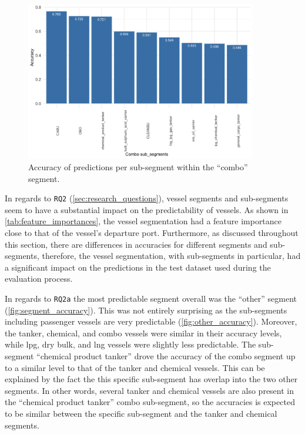 \begin{figure}[htbp]
    \centering
    \includegraphics[width=0.9\textwidth]{figures/results/seg_combo_acc}
    \caption{Accuracy of predictions per sub-segment within the ``combo'' segment.}
    \label{fig:combo_accuracy}
\end{figure}

In regards to \texttt{RQ2} (\cref{sec:research_questions}), vessel segments and sub-segments seem to have a substantial impact on the predictability of vessels. As shown in \cref{tab:feature_importances}, the vessel segmentation had a feature importance close to that of the vessel's departure port. Furthermore, as discussed throughout this section, there are differences in accuracies for different segments and sub-segments, therefore, the vessel segmentation, with sub-segments in particular, had a significant impact on the predictions in the test dataset used during the evaluation process.

In regards to \texttt{RQ2a} the most predictable segment overall was the ``other'' segment (\cref{fig:segment_accuracy}). This was not entirely surprising as the sub-segments including passenger vessels are very predictable (\cref{fig:other_accuracy}). Moreover, the tanker, chemical, and combo vessels were similar in their accuracy levels, while \acrshort{lpg}, dry bulk, and \acrshort{lng} vessels were slightly less predictable. The sub-segment ``chemical product tanker'' drove the accuracy of the combo segment up to a similar level to that of the tanker and chemical vessels. This can be explained by the fact the this specific sub-segment has overlap into the two other segments. In other words, several tanker and chemical vessels are also present in the ``chemical product tanker'' combo sub-segment, so the accuracies is expected to be similar between the specific sub-segment and the tanker and chemical segments.


